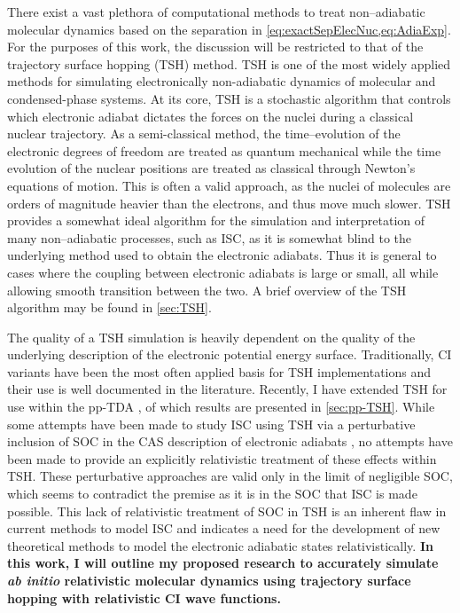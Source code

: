 There exist a vast plethora of computational methods to treat non--adiabatic
molecular dynamics based on the separation in
\cref{eq:exactSepElecNuc,eq:AdiaExp}. For the purposes of this work, the
discussion will be restricted to that of the trajectory surface hopping (TSH)
method.  TSH is one of the most widely applied methods for simulating
electronically non-adiabatic dynamics of molecular and condensed-phase
systems.\cite{Barbatti11_1759, Tavernelli14_62, Tully12_22A301, Tully98_407,
Hynes14_97} At its core, TSH is a stochastic algorithm that controls which
electronic adiabat dictates the forces on the nuclei during a classical nuclear
trajectory.\cite{Preston71_562} As a semi-classical method, the time--evolution
of the electronic degrees of freedom are treated as quantum mechanical while the
time evolution of the nuclear positions are treated as classical through
Newton's equations of motion. 
This is often a valid approach, as the nuclei of molecules are orders of
magnitude heavier than the electrons, and thus move much slower. TSH provides a
somewhat ideal algorithm for the simulation and interpretation of many
non--adiabatic processes, such as ISC, as it is somewhat blind to the underlying
method used to obtain the electronic adiabats. Thus it is general to cases where
the coupling between electronic adiabats is large or small, all while allowing
smooth transition between the two. A brief overview of the TSH algorithm may be
found in \cref{sec:TSH}. 


The quality of a TSH simulation is heavily dependent on the quality of the
underlying description of the electronic potential energy surface.
Traditionally, CI variants have been the most often applied basis for TSH
implementations and their use is well documented in the literature.  Recently, I
have extended TSH for use within the pp-TDA \cite{DBWY16_Submitted1}, of which
results are presented in \cref{sec:pp-TSH}.
While some attempts have been made to study ISC using TSH via
a perturbative inclusion of SOC in the CAS description of electronic adiabats 
\cite{Thiel14_JCP124101}, no attempts have been made to provide an explicitly
relativistic treatment of these effects within TSH. These perturbative
approaches are valid only in the limit of negligible SOC, which seems to
contradict the premise as it is in the SOC that ISC is made possible. This
lack of relativistic treatment of SOC in TSH is an inherent flaw in current
methods to model ISC and indicates a need for the development of new
theoretical methods to model the electronic adiabatic states relativistically.
{\bf 
In this work, I will outline my proposed research to accurately simulate
\emph{ab initio} relativistic molecular dynamics using trajectory surface
hopping with relativistic CI wave functions.
}

